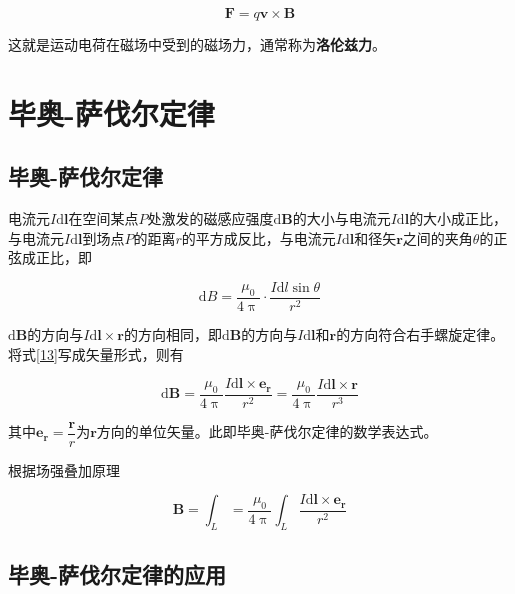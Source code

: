 \documentclass[12pt]{article}
\newcommand{\rmd}{\mathrm{d}}
\begin{document}
\begin{equation}
    \boldsymbol{F} = q \boldsymbol{v} \times \boldsymbol{B}
\end{equation}

这就是运动电荷在磁场中受到的磁场力，通常称为\textbf{洛伦兹力}。

\section{毕奥-萨伐尔定律}

\subsection{毕奥-萨伐尔定律}

电流元\(I \rmd \boldsymbol{l}\)在空间某点\(P\)处激发的磁感应强度\(\rmd \boldsymbol{B}\)的大小与电流元\(I\rmd \boldsymbol{l}\)的大小成正比，与电流元\(I\rmd \boldsymbol{l}\)到场点\(P\)的距离\(r\)的平方成反比，与电流元\(I\rmd \boldsymbol{l}\)和径矢\(\boldsymbol{r}\)之间的夹角\(\theta\)的正弦成正比，即

\begin{equation}
    \rmd B = \frac{\mu_0}{4 \uppi} \cdot \frac{I \rmd l \sin \theta}{r^2}
    \label{13}
\end{equation}

\(\rmd \boldsymbol{B}\)的方向与\(I \rmd \boldsymbol{l} \times \boldsymbol{r}\)的方向相同，即\(\rmd \boldsymbol{B}\)的方向与\(I \rmd \boldsymbol{l}\)和\(\boldsymbol{r}\)的方向符合右手螺旋定律。将式\ref{13}写成矢量形式，则有

\begin{equation}
    \rmd \boldsymbol{B} = \frac{\mu_0}{4 \uppi} \frac{I \rmd \boldsymbol{l} \times \boldsymbol{e_r}}{r^2} = \frac{\mu_0}{4 \uppi} \frac{I \rmd \boldsymbol{l} \times \boldsymbol{r}}{r^3}
\end{equation}

其中\(\boldsymbol{e_r} = \dfrac{\boldsymbol{r}}{r}\)为\(\boldsymbol{r}\)方向的单位矢量。此即毕奥-萨伐尔定律的数学表达式。

根据场强叠加原理

\begin{equation}
    \boldsymbol{B} =\int_{L} = \frac{\mu_0}{4 \uppi} \int_L \frac{I \rmd \boldsymbol{l} \times \boldsymbol{e_r}}{r^2}
\end{equation}

\subsection{毕奥-萨伐尔定律的应用}
\end{document}
